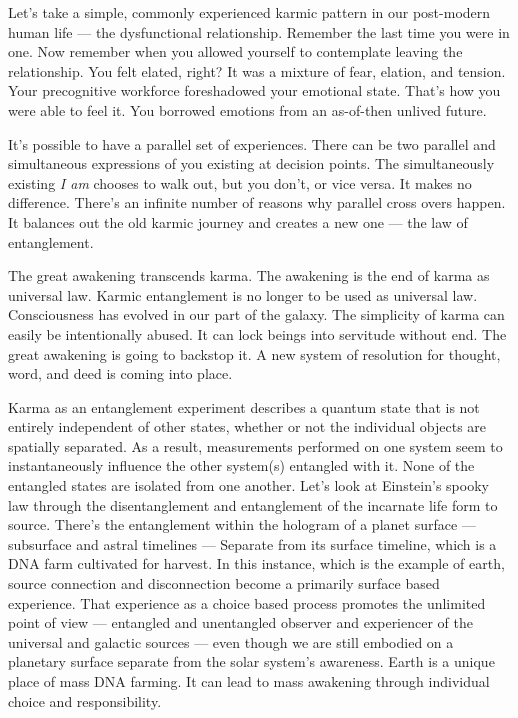 \documentclass[letterpaper,9pt,twoside,titlepage,onecolumn,openany]{book}
\begin{document}
Let's take a simple, commonly experienced karmic pattern in our
post-modern human life --- the dysfunctional relationship. Remember the
last time you were in one. Now remember when you allowed yourself to
contemplate leaving the relationship. You felt elated, right? It was a
mixture of fear, elation, and tension. Your precognitive workforce
foreshadowed your emotional state. That's how you were able to feel it.
You borrowed emotions from an as-of-then unlived future.

It's possible to have a parallel set of experiences. There can be two
parallel and simultaneous expressions of you existing at decision
points. The simultaneously existing \emph{I am} chooses to walk out, but
you don't, or vice versa. It makes no difference. There's an infinite
number of reasons why parallel cross overs happen. It balances out the
old karmic journey and creates a new one --- the law of entanglement.

The great awakening transcends karma. The awakening is the end of karma
as universal law. Karmic entanglement is no longer to be used as
universal law. Consciousness has evolved in our part of the galaxy. The
simplicity of karma can easily be intentionally abused. It can lock
beings into servitude without end. The great awakening is going to
backstop it. A new system of resolution for thought, word, and deed is
coming into place.

Karma as an entanglement experiment describes a quantum state that is
not entirely independent of other states, whether or not the individual
objects are spatially separated. As a result, measurements performed on
one system seem to instantaneously influence the other system(s)
entangled with it. None of the entangled states are isolated from one
another. Let's look at Einstein's spooky law through the disentanglement
and entanglement of the incarnate life form to source. There's the
entanglement within the hologram of a planet surface --- subsurface and
astral timelines --- Separate from its surface timeline, which is a DNA
farm cultivated for harvest. In this instance, which is the example of
earth, source connection and disconnection become a primarily surface
based experience. That experience as a choice based process promotes the
unlimited point of view --- entangled and unentangled observer and
experiencer of the universal and galactic sources --- even though we are
still embodied on a planetary surface separate from the solar system's
awareness. Earth is a unique place of mass DNA farming. It can lead to
mass awakening through individual choice and responsibility.
\end{document}
